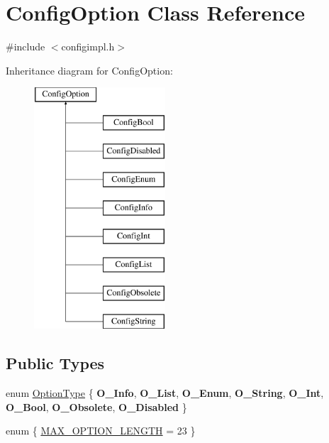 \hypertarget{class_config_option}{}\section{Config\+Option Class Reference}
\label{class_config_option}


{\ttfamily \#include $<$configimpl.\+h$>$}

Inheritance diagram for Config\+Option\+:\begin{figure}[H]
\begin{center}
\leavevmode
\includegraphics[height=9.000000cm]{class_config_option}
\end{center}
\end{figure}
\subsection*{Public Types}
\begin{DoxyCompactItemize}
\item 
enum \mbox{\hyperlink{class_config_option_ad60cb308cdf307e72796dc2fc2a40fda}{Option\+Type}} \{ \newline
{\bfseries O\+\_\+\+Info}, 
{\bfseries O\+\_\+\+List}, 
{\bfseries O\+\_\+\+Enum}, 
{\bfseries O\+\_\+\+String}, 
\newline
{\bfseries O\+\_\+\+Int}, 
{\bfseries O\+\_\+\+Bool}, 
{\bfseries O\+\_\+\+Obsolete}, 
{\bfseries O\+\_\+\+Disabled}
 \}
\item 
enum \{ \mbox{\hyperlink{class_config_option_a7e6106faa6a60aebbb84ff484e4ec85faa40e4123355dbeb41dc6ca0c68c0d346}{M\+A\+X\+\_\+\+O\+P\+T\+I\+O\+N\+\_\+\+L\+E\+N\+G\+TH}} = 23
 \}
\end{DoxyCompactItemize}
